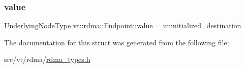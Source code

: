 \subsubsection{\texorpdfstring{value}{value}}
{\footnotesize\ttfamily \hyperlink{namespacevt_1_1rdma_a20d01bc82b95453c162d4b9857a4a78a}{Underlying\+Node\+Type} vt\+::rdma\+::\+Endpoint\+::value = uninitialized\+\_\+destination\hspace{0.3cm}{\ttfamily [private]}}



The documentation for this struct was generated from the following file\+:\begin{DoxyCompactItemize}
\item 
src/vt/rdma/\hyperlink{rdma__types_8h}{rdma\+\_\+types.\+h}\end{DoxyCompactItemize}
